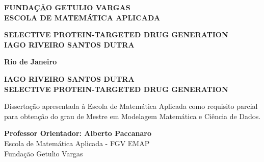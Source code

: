 \documentclass[a4paper,12pt]{article}
\begin{document}
\hypersetup{pageanchor=false}

\begin{titlepage}
    \begin{center}
        \textbf{\MakeUppercase{Fundação Getulio Vargas}}\\
        \vspace{16pt}
        \textbf{\MakeUppercase{Escola de Matemática Aplicada}}\\
        \vspace{16pt}

        \par
        \vspace{170pt}
        \textbf{\MakeUppercase{SELECTIVE PROTEIN-TARGETED DRUG GENERATION}}\\
        \vspace{32pt}
        \textbf{\MakeUppercase{Iago Riveiro Santos Dutra}}\\
    \end{center}

    \par
    \vfill
    \begin{center}
        {{\normalsize \textbf{Rio de Janeiro}} \\
            {\normalsize \textbf{\the\year}}}
    \end{center}
\end{titlepage}
\thispagestyle{empty}

\newpage
\begin{center}
    \textbf{\MakeUppercase{Iago Riveiro Santos Dutra}} \\[4cm]
    \textbf{\MakeUppercase{SELECTIVE PROTEIN-TARGETED DRUG GENERATION}}
\end{center}
\vspace{3cm}

\noindent\hspace{0.5\textwidth}
\parbox{7.5cm}{
    \onehalfspacing
    \upshape
    Dissertação apresentada à Escola de Matemática Aplicada como requisito parcial para obtenção do grau de Mestre em Modelagem Matemática e Ciência de Dados.
}

\vspace{3cm}

\vfill

\begin{center}
    \textbf{Professor Orientador: Alberto Paccanaro}\\
    Escola de Matemática Aplicada - FGV EMAP\\
    Fundação Getulio Vargas
\end{center}
\thispagestyle{empty}
\end{document}
